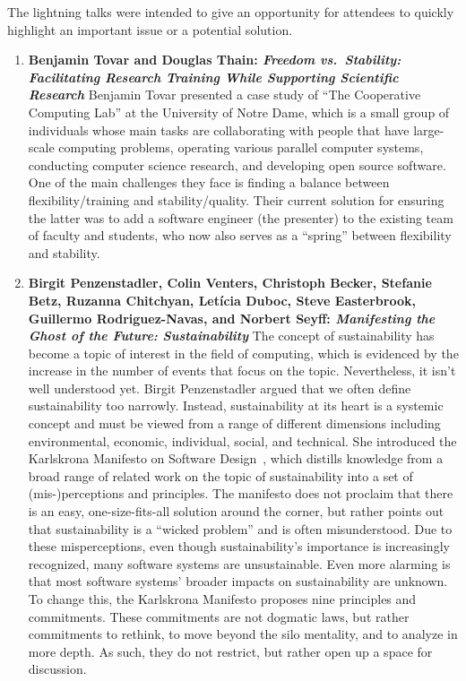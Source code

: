 \documentclass[11pt, oneside]{amsart}
\begin{document}
The lightning talks were intended to give an opportunity for attendees to
quickly highlight an important issue or a potential solution.
%
\begin{enumerate}
\item \textbf{Benjamin Tovar and Douglas Thain: \textit{Freedom vs.\ Stability:
Facilitating Research Training While Supporting Scientific Research}} Benjamin Tovar presented a case
study of ``The Cooperative Computing Lab'' at the University of Notre Dame, which is a
small group of individuals whose main tasks are collaborating with people that
have large-scale computing problems, operating various parallel computer
systems, conducting computer science research, and developing open source
software. One of the main challenges they face is finding a balance between
flexibility/training and stability/quality. Their current solution for ensuring
the latter was to add a software engineer (the presenter) to the existing team
of faculty and students, who now also serves as a ``spring'' between flexibility
and stability.

\item \textbf{Birgit Penzenstadler, Colin Venters, Christoph Becker, Stefanie
Betz, Ruzanna Chitchyan, Let\'{i}cia Duboc, Steve Easterbrook, Guillermo
Rodriguez-Navas, and Norbert Seyff: \textit{Manifesting the Ghost of the Future:
Sustainability}} The concept of sustainability has become a topic of interest in
the field of computing, which is evidenced by the increase in the number of
events that focus on the topic. Nevertheless, it isn't well understood yet.
Birgit Penzenstadler argued that we often define sustainability too narrowly. Instead,
sustainability at its heart is a systemic concept and must be viewed from a
range of different dimensions including environmental, economic, individual,
social, and technical. She introduced the Karlskrona Manifesto on Software
Design~\cite{Becker:2014}, which distills knowledge from a broad range of
related work on the topic of sustainability into a set of (mis-)perceptions and
principles. The manifesto does not proclaim that there is an easy,
one-size-fits-all solution around the corner, but rather points out that
sustainability is a ``wicked problem'' and is often misunderstood. Due to these
misperceptions, even though sustainability's importance is increasingly
recognized, many software systems are unsustainable. Even more alarming is that
most software systems' broader impacts on sustainability are unknown. To change
this, the Karlskrona Manifesto proposes nine principles and commitments. These
commitments are not dogmatic laws, but rather commitments to rethink, to move
beyond the silo mentality, and to analyze in more depth. As such, they do not
restrict, but rather open up a space for discussion.


\end{enumerate}
\end{document}
